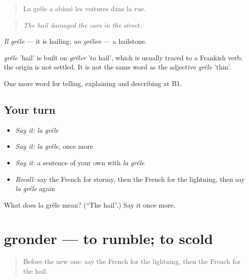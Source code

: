 \begin{quote}
La grêle a abîmé les voitures dans la rue.
\end{quote}

\begin{quote}
\emph{The hail damaged the cars in the street.}
\end{quote}

\emph{Il grêle} — it is hailing; \emph{un grêlon} — a hailstone.

\begin{cousinweb}
\emph{grêle} 'hail' is built on \emph{grêler} 'to hail', which is usually traced to a Frankish verb; the origin is not settled. It is not the same word as the adjective \emph{grêle} 'thin'.
\end{cousinweb}

\begin{grammarlens}[title={What you've built}]
One more word for telling, explaining and describing at B1.
\end{grammarlens}

\subsection*{Your turn}
\begin{itemize}
\raggedright
  \item \emph{Say it:} \emph{la grêle}
  \item \emph{Say it:} \emph{la grêle}, once more
  \item \emph{Say it:} a sentence of your own with \emph{la grêle}
  \item \emph{Recall:} say the French for stormy, then the French for the lightning, then say \emph{la grêle} again
\end{itemize}

\begin{tcolorbox}[breakable,colback=teal!4,colframe=teal!35!black,title={Before you move on}]
What does la grêle mean? (\textquotedblleft{}The hail\textquotedblright{}.) Say it once more.
\end{tcolorbox}
\section[gronder]{gronder — to rumble; to scold}

\label{lesson:FR-C462-gronder}



\begin{quote}
Before the new one: say the French for the lightning, then the French for the hail.
\end{quote}

